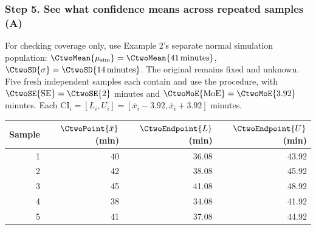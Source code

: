\subsubsection*{Step 5. See what confidence means across repeated samples (A)}
For checking coverage only, use Example 2's separate normal simulation population:
$\CtwoMean{\mu_{\rm sim}}=\CtwoMean{41\,\text{minutes}}$,
$\CtwoSD{\sigma}=\CtwoSD{14\,\text{minutes}}$.
The original \CtwoMean{$\mu$} remains fixed and unknown.
Five fresh independent samples each contain  and use the
 procedure, with $\CtwoSE{\mathrm{SE}}=\CtwoSE{2}$ minutes and
$\CtwoMoE{\mathrm{MoE}}=\CtwoMoE{3.92}$ minutes.
Each $\mathrm{CI}_i=[L_i,U_i]=[\bar{x}_i-3.92,\bar{x}_i+3.92]$ minutes.
\begin{center}
\begin{tabular}{@{}rrrr@{}}\toprule
Sample & $\CtwoPoint{\bar{x}}$ (min) & $\CtwoEndpoint{L}$ (min) & $\CtwoEndpoint{U}$ (min)\\\midrule
1 & 40 & 36.08 & 43.92\\
2 & 42 & 38.08 & 45.92\\
3 & 45 & 41.08 & 48.92\\
4 & 38 & 34.08 & 41.92\\
5 & 41 & 37.08 & 44.92\\\bottomrule
\end{tabular}
\end{center}
